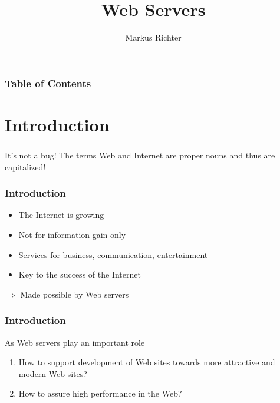 \documentclass[9pt]{beamer}
\title{Web Servers}
\author[Richter]{Markus Richter}
\institute{Institut für Softwaretechnik und Programmiersprachen}
\begin{document}
\frame{\titlepage}

\begin{frame}
\frametitle<presentation>{Table of Contents}
\tableofcontents
\end{frame}

\section{Introduction}
\begin{frame}
\frametitle<presentation>{}
  \begin{alertblock}{It's not a bug!}
  The terms Web and Internet are proper nouns and thus are capitalized!
  \end{alertblock}
\end{frame}

\begin{frame}
\frametitle<presentation>{Introduction}
  \begin{itemize}
    \item The Internet is growing
    \item Not for information gain only
    \item Services for business, communication, entertainment
    \item Key to the success of the Internet
  \end{itemize}
  $\Longrightarrow$  Made possible by Web servers
\end{frame}


\begin{frame}
\frametitle<presentation>{Introduction}
As Web servers play an important role

\begin{enumerate}
  \item How to support development of Web sites towards more attractive and modern Web sites?
  \item How to assure high performance in the Web?
\end{enumerate}

\end{frame}
\end{document}
